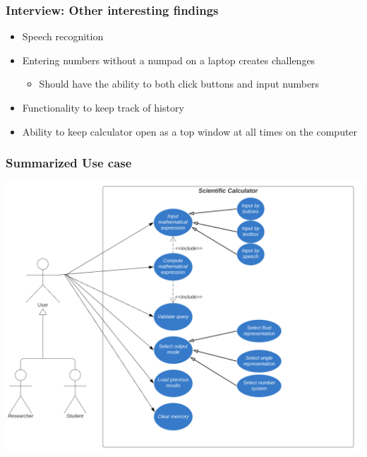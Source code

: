 \documentclass{beamer}
\begin{document}
  \begin{frame}
  \frametitle{Interview: Other interesting findings}
  \begin{itemize}
   \item Speech recognition
   \item Entering numbers without a numpad on a laptop creates challenges
       \begin{itemize}
     \item Should have the ability to both click buttons and input numbers
    \end{itemize}
   \item Functionality to keep track of history
   \item Ability to keep calculator open as a top window at all times on the computer
  \end{itemize}
  \end{frame}
  

  \begin{frame}
  \frametitle{Summarized Use case}
  \includegraphics[scale=0.5]{Use Case}
  \end{frame}
\end{document}
